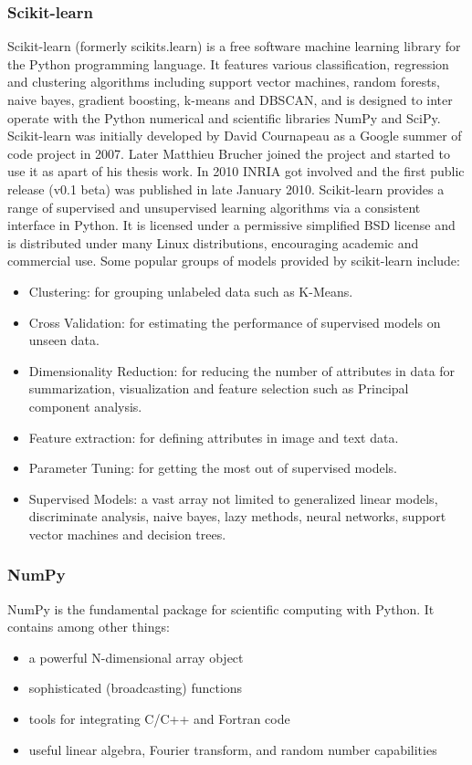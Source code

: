 \subsubsection{Scikit-learn}
Scikit-learn (formerly scikits.learn) is a free software machine learning library for the Python programming language. It features various classification, regression and clustering algorithms including support vector machines, random forests, naive bayes, gradient boosting, k-means and DBSCAN, and is designed to inter operate with the Python numerical and scientific libraries NumPy and SciPy. Scikit-learn was initially developed by David Cournapeau as a Google summer of code project in 2007. Later Matthieu Brucher joined the project and started to use it as apart of his thesis work. In 2010 INRIA got involved and the first public release (v0.1 beta) was published in late January 2010. Scikit-learn provides a range of supervised and unsupervised learning algorithms via a consistent interface in Python. It is licensed under a permissive simplified BSD license and is distributed under many Linux distributions, encouraging academic and commercial use. 
Some popular groups of models provided by scikit-learn include: 
\begin{itemize}
	\item Clustering: for grouping unlabeled data such as K-Means.
	\item Cross Validation: for estimating the performance of supervised models on unseen data.
	\item Dimensionality Reduction: for reducing the number of attributes in data for summarization, visualization and feature selection such as Principal component analysis. 
	\item Feature extraction: for defining attributes in image and text data. 
	\item Parameter Tuning: for getting the most out of supervised models. 
	\item Supervised Models: a vast array not limited to generalized linear models, discriminate analysis, naive bayes, lazy methods, neural networks, support vector machines and decision trees. 
\end{itemize}

\subsubsection{NumPy}
NumPy is the fundamental package for scientific computing with Python. It contains among other things:
\begin{itemize}[nosep]
  \item a powerful N-dimensional array object
  \item sophisticated (broadcasting) functions
  \item tools for integrating C/C++ and Fortran code
  \item useful linear algebra, Fourier transform, and random number capabilities
\end{itemize}

